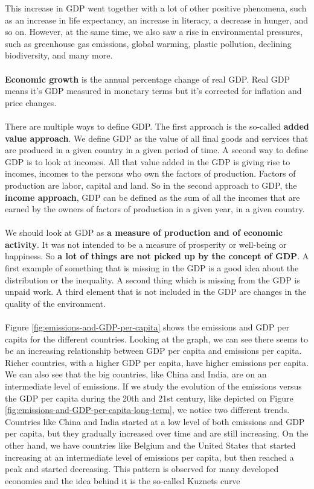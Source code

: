 \documentclass[../summary.tex]{subfiles}
\begin{document}
	\newpage
	This increase in GDP went together with a lot of other positive phenomena, such as an increase in life expectancy, an increase in literacy, a decrease in hunger, and so on. However, at the same time, we also saw a rise in environmental pressures, such as greenhouse gas emissions, global warming, plastic pollution, declining biodiversity, and many more. 
	\\\\
	\textbf{Economic growth} is the annual percentage change of real GDP. Real GDP means it's GDP measured in monetary terms but it's corrected for inflation and price changes.
	\\\\
	There are multiple ways to define GDP. The first approach is the so-called \textbf{added value approach}. We define GDP as the value of all final goods and services that are produced in a given country in a given period of time. A second way to define GDP is to look at incomes. All that value added in the GDP is giving rise to incomes, incomes to the persons who own the factors of production. Factors of production are labor, capital and land. So in the second approach to GDP, the \textbf{income approach}, GDP can be defined as the sum of all the incomes that are earned by the owners of factors of production in a given year, in a given country. 
	\\\\
	We should look at GDP as \textbf{a measure of production and of economic activity}. It was not intended to be a measure of prosperity or well-being or happiness. So \textbf{a lot of things are not picked up by the concept of GDP}. A first example of something that is missing in the GDP is a good idea about the distribution or the inequality. A second thing which is missing from the GDP is unpaid work. A third element that is not included in the GDP are changes in the quality of the environment.
	\\\\	
	Figure \ref{fig:emissions-and-GDP-per-capita} shows the emissions and GDP per capita for the different countries. Looking at the graph, we can see there seems to be an increasing relationship between GDP per capita and emissions per capita. Richer countries, with a higher GDP per capita, have higher emissions per capita. We can also see that the big countries, like China and India, are on an intermediate level of emissions. If we study the evolution of the emissions versus the GDP per capita during the 20th and 21st century, like depicted on Figure \ref{fig:emissions-and-GDP-per-capita-long-term}, we notice two different trends. Countries like China and India started at a low level of both emissions and GDP per capita, but they gradually increased over time and are still increasing. On the other hand, we have countries like Belgium and the United States that started increasing at an intermediate level of emissions per capita, but then reached a peak and started decreasing. This pattern is observed for many developed economies and the idea behind it is the so-called Kuznets curve
	
\end{document}
